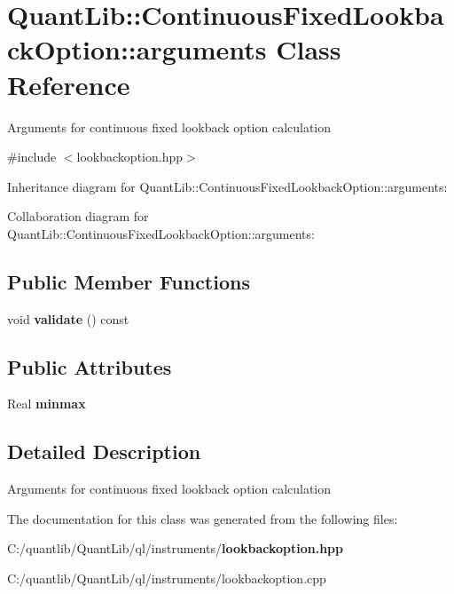 \section{Quant\+Lib\+:\+:Continuous\+Fixed\+Lookback\+Option\+:\+:arguments Class Reference}
\label{class_quant_lib_1_1_continuous_fixed_lookback_option_1_1arguments}


Arguments for continuous fixed lookback option calculation  




{\ttfamily \#include $<$lookbackoption.\+hpp$>$}



Inheritance diagram for Quant\+Lib\+:\+:Continuous\+Fixed\+Lookback\+Option\+:\+:arguments\+:


Collaboration diagram for Quant\+Lib\+:\+:Continuous\+Fixed\+Lookback\+Option\+:\+:arguments\+:
\subsection*{Public Member Functions}
\begin{DoxyCompactItemize}
\item 
void {\bfseries validate} () const \label{class_quant_lib_1_1_continuous_fixed_lookback_option_1_1arguments_a939d6e8a52047e94d4c99dba7781cd85}

\end{DoxyCompactItemize}
\subsection*{Public Attributes}
\begin{DoxyCompactItemize}
\item 
Real {\bfseries minmax}\label{class_quant_lib_1_1_continuous_fixed_lookback_option_1_1arguments_a5bfe12abbbf75a011f3c85f31921f318}

\end{DoxyCompactItemize}


\subsection{Detailed Description}
Arguments for continuous fixed lookback option calculation 

The documentation for this class was generated from the following files\+:\begin{DoxyCompactItemize}
\item 
C\+:/quantlib/\+Quant\+Lib/ql/instruments/{\bf lookbackoption.\+hpp}\item 
C\+:/quantlib/\+Quant\+Lib/ql/instruments/lookbackoption.\+cpp\end{DoxyCompactItemize}
